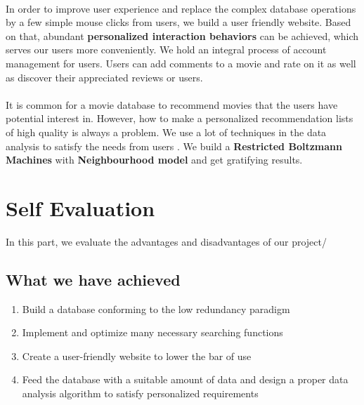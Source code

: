 \begin{CJK*}{UTF8}{gbsn}
\paragraph{} In order to improve user experience and replace the complex database operations by a few simple mouse clicks from users, we build a user friendly website. Based on that, abundant \textbf{personalized interaction behaviors} can be achieved, which serves our users more conveniently. We hold an integral process of account management for users. Users can add comments to a movie and rate on it as well as discover their appreciated reviews or users.
\paragraph{} It is common for a movie database to recommend movies that the users have potential interest in. However,  how to make a personalized recommendation lists of high quality is always a problem. We use a lot of techniques in the data analysis to satisfy the needs from users . We build a \textbf{Restricted Boltzmann Machines}  with \textbf{Neighbourhood model} and get gratifying results.
\section{Self Evaluation}
In this part, we evaluate the advantages and disadvantages of our project/
\subsection{What we have achieved}
\begin{enumerate}
\item Build a database conforming to the low redundancy paradigm
\item Implement and optimize many necessary  searching functions
\item Create a user-friendly website to lower the bar of use
\item Feed the database with a suitable amount of data and design a proper data analysis algorithm to satisfy personalized requirements
\end{enumerate}

\end{CJK*}

